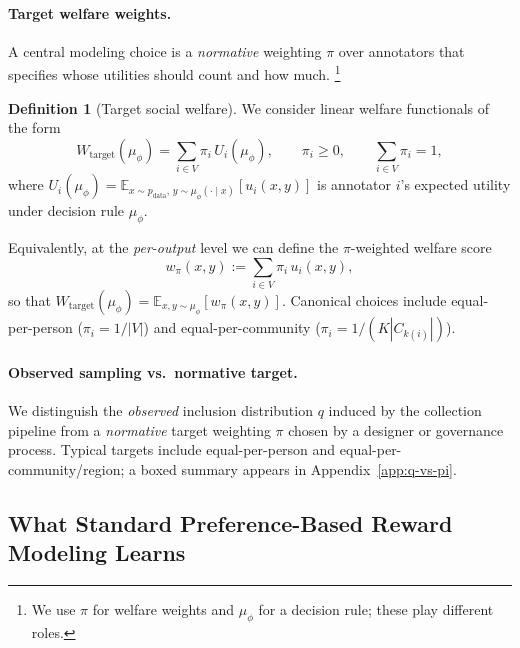 \documentclass{article}
\theoremstyle{plain}
\theoremstyle{definition}
\newtheorem{definition}[theorem]{Definition}
\theoremstyle{remark}
\begin{document}
\paragraph{Target welfare weights.}
A central modeling choice is a \emph{normative} weighting $\pi$ over annotators
that specifies whose utilities should count and how much.%
\footnote{We use $\pi$ for welfare weights and $\mu_\phi$ for a decision rule;
these play different roles.}

\begin{definition}[Target social welfare]
\label{def:target-welfare}
We consider linear welfare functionals of the form
\begin{equation}
    W_{\text{target}}(\mu_\phi)
    =
    \sum_{i\in V}\pi_i\, U_i(\mu_\phi),
    \qquad
    \pi_i\ge 0,
    \qquad
    \sum_{i\in V}\pi_i=1,
    \label{eq:target-welfare}
\end{equation}
where
$U_i(\mu_\phi)
=
\mathbb{E}_{x\sim p_{\text{data}},\,y\sim\mu_\phi(\cdot\mid x)}[u_i(x,y)]$
is annotator $i$'s expected utility under decision rule $\mu_\phi$.
\end{definition}

Equivalently, at the \emph{per-output} level we can define the $\pi$-weighted
welfare score
\begin{equation}
    w_\pi(x,y) := \sum_{i\in V}\pi_i\, u_i(x,y),
\end{equation}
so that $W_{\text{target}}(\mu_\phi)=\mathbb{E}_{x,y\sim\mu_\phi}[w_\pi(x,y)]$.
Canonical choices include equal-per-person ($\pi_i=1/|V|$) and
equal-per-community ($\pi_i=1/(K|C_{k(i)}|)$).

\paragraph{Observed sampling vs.\ normative target.}
We distinguish the \emph{observed} inclusion distribution $q$ induced by the collection pipeline from a
\emph{normative} target weighting $\pi$ chosen by a designer or governance process.
Typical targets include equal-per-person and equal-per-community/region; a boxed summary appears in Appendix~\ref{app:q-vs-pi}.

\subsection{What Standard Preference-Based Reward Modeling Learns}
\label{subsec:standard-rm}
\end{document}
